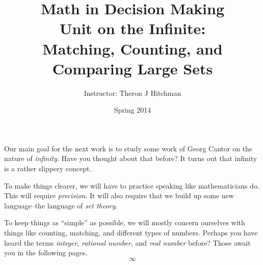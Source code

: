 \documentclass[12pt]{article}
\begin{document}
\title{Math in Decision Making\\ Unit on the Infinite:\\
Matching, Counting, and Comparing Large Sets}
\author{Instructor: Theron J Hitchman}
\date{Spring 2014}


\maketitle

Our main goal for the next work is to study some work of Georg Cantor on the nature of \emph{infinity}. Have you thought about that before? It turns out that infinity is a rather slippery concept. 

To make things clearer, we will have to practice speaking like mathematicians do. This will require \emph{precision}. It will also require that we build up some new language--the language of \emph{set theory}.

To keep things as ``simple'' as possible, we will mostly concern ourselves with things like counting, matching, and different types of numbers. Perhaps you have heard the terms \emph{integer}, \emph{rational number}, and \emph{real number} before? Those await you in the following pages.\\

\[
\infty
\]

\newpage
$\phantom{Theron J Hitchman}$
\newpage

$\phantom{Theron J Hitchman}$
\newpage

\newpage
$\phantom{Theron J Hitchman}$
\newpage


\newpage
$\phantom{Theron J Hitchman}$
\newpage

\newpage
$\phantom{Theron J Hitchman}$
\newpage

\newpage
$\phantom{Theron J Hitchman}$
\newpage

\newpage
$\phantom{Theron J Hitchman}$
\newpage



\newpage
$\phantom{Theron J Hitchman}$
\newpage



\end{document}
